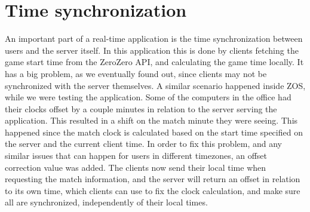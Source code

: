 \section{Time synchronization}

An important part of a real-time application is the time synchronization between users and the server itself. In this application this is done by clients fetching the game start time from the ZeroZero API, and calculating the game time locally. It has a big problem, as we eventually found out, since clients may not be synchronized with the server themselves. A similar scenario happened inside ZOS, while we were testing the application. Some of the computers in the office had their clocks offset by a couple minutes in relation to the server serving the application. This resulted in a shift on the match minute they were seeing. This happened since the match clock is calculated based on the start time specified on the server and the current client time. In order to fix this problem, and any similar issues that can happen for users in different timezones, an offset correction value was added. The clients now send their local time when requesting the match information, and the server will return an offset in relation to its own time, which clients can use to fix the clock calculation, and make sure all are synchronized, independently of their local times.
